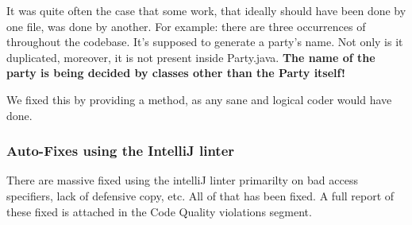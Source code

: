 It was quite often the case that some work, that ideally should have been done by one file, was done by another. For example: there are three occurrences of  throughout the codebase. It's supposed to generate a party's name. Not only is it duplicated, moreover, it is not present inside Party.java. \textbf{The name of the party is being decided by classes other than the Party itself!}

We fixed this by providing a  method, as any sane and logical coder would have done.


\subsubsection{Auto-Fixes using the IntelliJ linter}

There are massive fixed using the intelliJ linter primarilty on bad access specifiers, lack of defensive copy, etc. All of that has been fixed. A full report of these fixed is attached in the Code Quality violations segment.